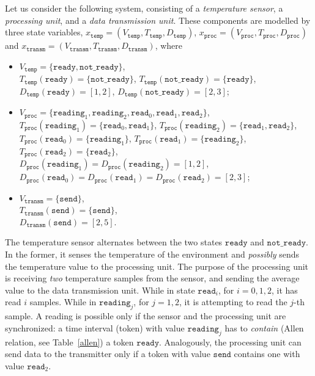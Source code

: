 \begin{example}
Let us consider the following system, consisting of a \emph{temperature sensor}, a \emph{processing unit}, and a \emph{data transmission unit}.
These components are modelled by three state variables, $x_\mathtt{temp}=(V_\mathtt{temp},T_\mathtt{temp},D_\mathtt{temp})$, $x_\mathtt{proc}=(V_\mathtt{proc},T_\mathtt{proc},D_\mathtt{proc})$ and $x_\mathtt{transm}=(V_\mathtt{transm},T_\mathtt{transm},D_\mathtt{transm})$, where
\begin{itemize}
    \item $V_\mathtt{temp}=\{\mathtt{ready}, \mathtt{not\_ready}\}$, \\
    $T_\mathtt{temp}(\mathtt{ready})=\{\mathtt{not\_ready}\}$, $T_\mathtt{temp}(\mathtt{not\_ready})=\{\mathtt{ready}\}$, \\ $D_\mathtt{temp}(\mathtt{ready})=[1,2]$, $D_\mathtt{temp}(\mathtt{not\_ready})=[2,3]$;
    \item $V_\mathtt{proc}=\{\mathtt{reading}_1,\mathtt{reading}_2,\mathtt{read}_0,\mathtt{read}_1,\mathtt{read}_2\}$, \\
    $T_\mathtt{proc}(\mathtt{reading}_1)=\{\mathtt{read}_0,\mathtt{read}_1\}$,
    $T_\mathtt{proc}(\mathtt{reading}_2)=\{\mathtt{read}_1,\allowbreak \mathtt{read}_2\}$,
    $T_\mathtt{proc}(\mathtt{read}_0)=\{\mathtt{reading}_1\}$, $T_\mathtt{proc}(\mathtt{read}_1)=\{\mathtt{reading}_2\}$,
    $T_\mathtt{proc}(\mathtt{read}_2)=\{\mathtt{read}_2\}$, \\
    $D_\mathtt{proc}(\mathtt{reading}_1)=D_\mathtt{proc}(\mathtt{reading}_2)=[1,2]$, $D_\mathtt{proc}(\mathtt{read}_0)=D_\mathtt{proc}(\mathtt{read}_1)=D_\mathtt{proc}(\mathtt{read}_2)=[2,3]$;
    \item $V_\mathtt{transm}=\{\mathtt{send}\}$,\\
    $T_\mathtt{transm}(\mathtt{send})=\{\mathtt{send}\}$,\\
    $D_\mathtt{transm}(\mathtt{send})=[2,5]$.
\end{itemize}

The temperature sensor alternates between the two states $\mathtt{ready}$ and $\mathtt{not\_ready}$. In the former, it senses the temperature of the environment and \emph{possibly} sends the temperature value to the processing unit.
The purpose of the processing unit is receiving \emph{two} temperature samples from the sensor, and sending the average value to the data transmission unit. While in state $\mathtt{read}_i$, for $i=0,1,2$, it has read $i$ samples. While in $\mathtt{reading}_j$, for $j=1,2$, it is attempting to read the $j$-th sample. A reading is possible only if the sensor and the processing unit are synchronized: a time interval (token) with value $\mathtt{reading}_j$ has to \emph{contain} (Allen relation, see Table~\ref{allen}) a token $\mathtt{ready}$. 
Analogously, the processing unit can send data to the transmitter only if a token with value $\mathtt{send}$ contains one with value $\mathtt{read}_2$.


\end{example}
